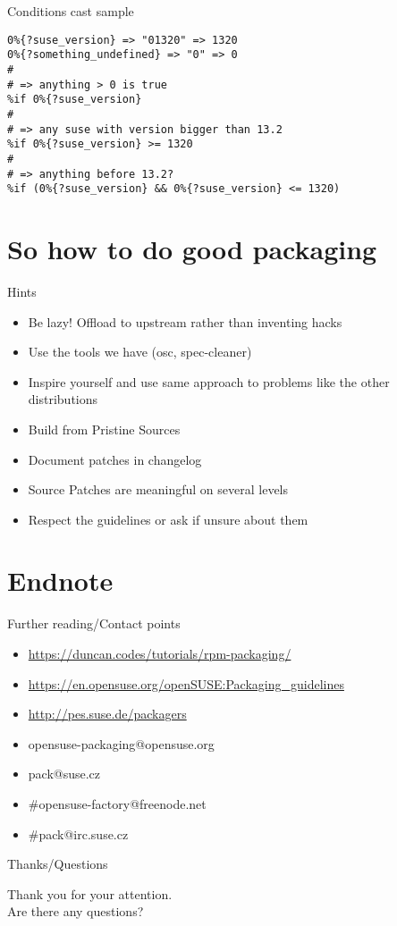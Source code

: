 \documentclass{beamer}
\begin{document}
\begin{frame}[fragile]{Conditions cast sample}
       \begin{small}
       \begin{verbatim}
0%{?suse_version} => "01320" => 1320
0%{?something_undefined} => "0" => 0
#
# => anything > 0 is true
%if 0%{?suse_version}
#
# => any suse with version bigger than 13.2
%if 0%{?suse_version} >= 1320
#
# => anything before 13.2?
%if (0%{?suse_version} && 0%{?suse_version} <= 1320)
       \end{verbatim}
       \end{small}
\end{frame}

\section{So how to do good packaging}

\begin{frame}[t]{Hints}
	\begin{itemize}
	\item Be lazy! Offload to upstream rather than inventing hacks
    \item Use the tools we have (osc, spec-cleaner)
    \item Inspire yourself and use same approach to problems like the other distributions
    \item Build from Pristine Sources
    \item Document patches in changelog
    \item Source Patches are meaningful on several levels
    \item Respect the guidelines or ask if unsure about them
	\end{itemize}
\end{frame}

\section{Endnote}

\begin{frame}[t]{Further reading/Contact points}
	\begin{itemize}
	\item \url{https://duncan.codes/tutorials/rpm-packaging/}
	\item \url{https://en.opensuse.org/openSUSE:Packaging\_guidelines}
	\item \url{http://pes.suse.de/packagers}
	\item opensuse-packaging@opensuse.org
	\item pack@suse.cz
	\item \#opensuse-factory@freenode.net 
	\item \#pack@irc.suse.cz
	\end{itemize}
\end{frame}

\begin{frame}{Thanks/Questions}
	\begin{center}
	Thank you for your attention.\\
	Are there any questions?
	\end{center}
\end{frame}
\end{document}

